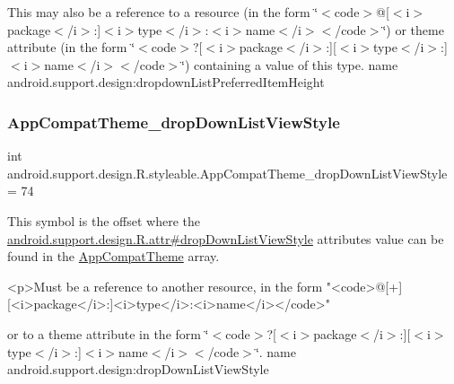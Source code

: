 This may also be a reference to a resource (in the form \char`\"{}$<$code$>$@\mbox{[}$<$i$>$package$<$/i$>$\+:\mbox{]}$<$i$>$type$<$/i$>$\+:$<$i$>$name$<$/i$>$$<$/code$>$\char`\"{}) or theme attribute (in the form \char`\"{}$<$code$>$?\mbox{[}$<$i$>$package$<$/i$>$\+:\mbox{]}\mbox{[}$<$i$>$type$<$/i$>$\+:\mbox{]}$<$i$>$name$<$/i$>$$<$/code$>$\char`\"{}) containing a value of this type.  name android.\+support.\+design\+:dropdown\+List\+Preferred\+Item\+Height \mbox{\label{classandroid_1_1support_1_1design_1_1R_1_1styleable_aef3b0acbfc00c4f336874396809841c3}} 
\subsubsection{\texorpdfstring{App\+Compat\+Theme\+\_\+drop\+Down\+List\+View\+Style}{AppCompatTheme\_dropDownListViewStyle}}
{\footnotesize\ttfamily int android.\+support.\+design.\+R.\+styleable.\+App\+Compat\+Theme\+\_\+drop\+Down\+List\+View\+Style = 74\hspace{0.3cm}{\ttfamily [static]}}

This symbol is the offset where the \hyperlink{classandroid_1_1support_1_1design_1_1R_1_1attr_ae3bfc4373a4b49924e4173313505b015}{android.\+support.\+design.\+R.\+attr\#drop\+Down\+List\+View\+Style} attribute\textquotesingle{}s value can be found in the \hyperlink{classandroid_1_1support_1_1design_1_1R_1_1styleable_afb351dc8de20cbd4c89abe360373010c}{App\+Compat\+Theme} array.

\begin{DoxyVerb}      <p>Must be a reference to another resource, in the form "<code>@[+][<i>package</i>:]<i>type</i>:<i>name</i></code>"
\end{DoxyVerb}
 or to a theme attribute in the form \char`\"{}$<$code$>$?\mbox{[}$<$i$>$package$<$/i$>$\+:\mbox{]}\mbox{[}$<$i$>$type$<$/i$>$\+:\mbox{]}$<$i$>$name$<$/i$>$$<$/code$>$\char`\"{}.  name android.\+support.\+design\+:drop\+Down\+List\+View\+Style \mbox{\label{classandroid_1_1support_1_1design_1_1R_1_1styleable_a1ee151d494fb454277ff281e425c5556}} 
